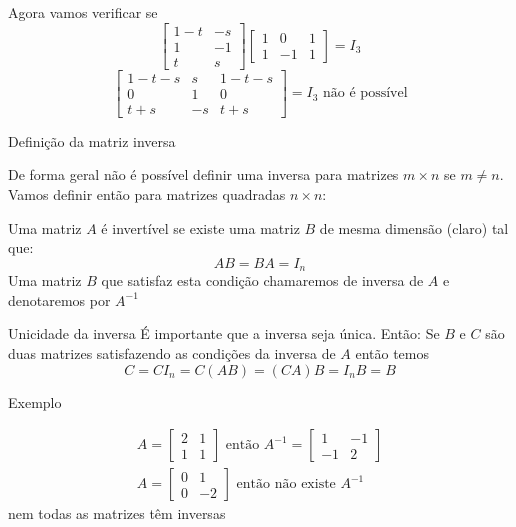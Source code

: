 \documentclass{beamer}
\begin{document}
\begin{frame}{}
  Agora vamos verificar se 
  $$ 
  \begin{bmatrix}
    1-t & -s \\ 1 & -1 \\ t & s
  \end{bmatrix}\begin{bmatrix}
    1 & 0 & 1 \\
    1 & -1 & 1
  \end{bmatrix}=I_3$$
  $$ \begin{bmatrix}
    1-t-s & s & 1 -t -s \\
    0 & 1 & 0 \\
    t+s & -s & t+s
  \end{bmatrix} = I_3 \text{ não é possível}$$

\end{frame}

\begin{frame}{Definição da matriz inversa}

De forma geral não é possível definir uma inversa para matrizes $m\times n$ se $m\neq n$. Vamos definir então para
matrizes quadradas $n\times n$:

Uma matriz $A$ é invertível se existe uma matriz $B$ de mesma dimensão (claro) tal que:
$$ AB=BA = I_n $$
Uma matriz $B$ que satisfaz esta condição chamaremos de inversa de $A$ e denotaremos por $A^{-1}$
  
  \end{frame} 


\begin{frame}{Unicidade da inversa }
  É importante que a inversa seja única. Então:
  Se $B$ e $C$ são duas matrizes satisfazendo as condições da inversa de $A$ então temos
  $$ C= CI_n = C(AB)=(CA)B = I_nB=B $$
 
  
\end{frame}

\begin{frame}{ Exemplo }

  \begin{gather*}
   A= \begin{bmatrix}
      2 & 1 \\ 1 & 1 
    \end{bmatrix} \text{ então } A^{-1}=\begin{bmatrix}
      1 & -1 \\ -1 & 2
    \end{bmatrix} \\
    A= \begin{bmatrix}
      0 & 1 \\
      0 & -2 
    \end{bmatrix} \text{ então  não existe } A^{-1}
  \end{gather*}
 nem todas as matrizes têm inversas 
\end{frame}
\end{document}
